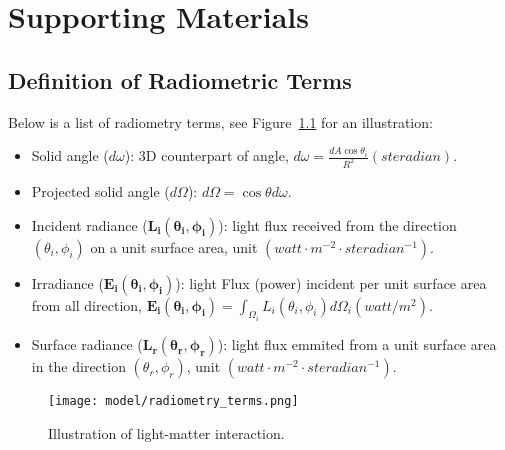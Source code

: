\chapter{Supporting Materials}


\section{Definition of Radiometric Terms}
Below is a list of radiometry terms, see Figure~\ref{fig:radiometry_terms} for an illustration:
\begin{itemize}
\item Solid angle ($d\omega$): 3D counterpart of angle, $d\omega=\frac{dA \cos\theta_i}{R^2}\mathit{ (steradian)}$.
\item Projected solid angle ($d\Omega$): $d\Omega = \cos\theta d\omega$.
\item Incident radiance ($\mathbf{L_i(\theta_i, \phi_i)}$): light flux received from the direction $(\theta_i, \phi_i)$ on a unit surface area, unit $\mathit{ (watt\cdot m^{-2}\cdot steradian^{-1})}$.
\item Irradiance ($\mathbf{E_i(\theta_i, \phi_i)}$): light Flux (power) incident per unit surface area from all direction, $\mathbf{E_i(\theta_i, \phi_i)}=\int_{\Omega_i} L_i(\theta_i, \phi_i) d\Omega_i \mathit{ (watt/m^2)}$.
\item Surface radiance ($\mathbf{L_r(\theta_r, \phi_r)}$): light flux emmited from a unit surface area in the direction $(\theta_r, \phi_r)$, unit $\mathit{ (watt\cdot m^{-2}\cdot steradian^{-1})}$.
\end{itemize}

\begin{figure}[!htbp]
\centering
\texttt{[image: model/radiometry\_terms.png]}
\caption{Illustration of light-matter interaction.}
\label{fig:radiometry_terms}
\end{figure}

